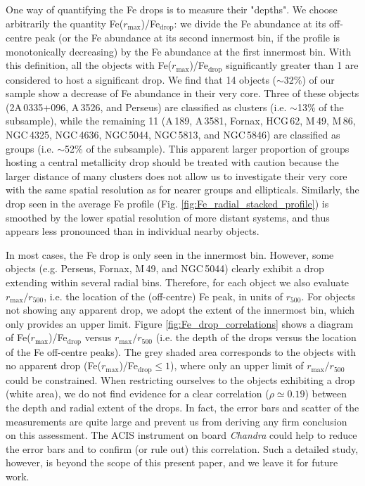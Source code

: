 \documentclass{aa}
\begin{document}
One way of quantifying the Fe drops is to measure their "depths". We choose arbitrarily the quantity Fe($r_\text{max}$)/Fe$_\text{drop}$: we divide the Fe abundance at its off-centre peak (or the Fe abundance at its second innermost bin, if the profile is monotonically decreasing) by the Fe abundance at the first innermost bin. With this definition, all the objects with Fe($r_\text{max}$)/Fe$_\text{drop}$ significantly greater than 1 are considered to host a significant drop. We find that 14 objects ($\sim$32\%) of our sample show a decrease of Fe abundance in their very core. Three of these objects (2A\,0335+096, A\,3526, and Perseus) are classified as clusters (i.e. $\sim$13\% of the subsample), while the remaining 11 (A\,189, A\,3581, Fornax, HCG\,62, M\,49, M\,86, NGC\,4325, NGC\,4636, NGC\,5044, NGC\,5813, and NGC\,5846) are classified as groups (i.e. $\sim$52\% of the subsample). This apparent larger proportion of groups hosting a central metallicity drop should be treated with caution because the larger distance of many clusters does not allow us to investigate their very core with the same spatial resolution as for nearer groups and ellipticals. Similarly, the drop seen in the average Fe profile (Fig. \ref{fig:Fe_radial_stacked_profile}) is smoothed by the lower spatial resolution of more distant systems, and thus appears less pronounced than in individual nearby objects.

In most cases, the Fe drop is only seen in the innermost bin. However, some objects (e.g. Perseus, Fornax, M\,49, and NGC\,5044) clearly exhibit a drop extending within several radial bins. Therefore, for each object we also evaluate $r_\text{max}/r_{500}$, i.e. the location of the (off-centre) Fe peak, in units of $r_{500}$. For objects not showing any apparent drop, we adopt the extent of the innermost bin, which only provides an upper limit. Figure \ref{fig:Fe_drop_correlations} shows a diagram of Fe($r_\text{max}$)/Fe$_\text{drop}$ versus $r_\text{max}/r_{500}$ (i.e. the depth of the drops versus the location of the Fe off-centre peaks). The grey shaded area corresponds to the objects with no apparent drop (Fe($r_\text{max}$)/Fe$_\text{drop} \le 1$), where only an upper limit of $r_\text{max}/r_{500}$ could be constrained. When restricting ourselves to the objects exhibiting a drop (white area), we do not find evidence for a clear correlation ($\rho \simeq 0.19$) between the depth and radial extent of the drops. In fact, the error bars and scatter of the measurements are quite large and prevent us from deriving any firm conclusion on this assessment. The ACIS instrument on board \textit{Chandra} could help to reduce the error bars and to confirm (or rule out) this correlation. Such a detailed study, however, is beyond the scope of this present paper, and we leave it for future work.
\end{document}
